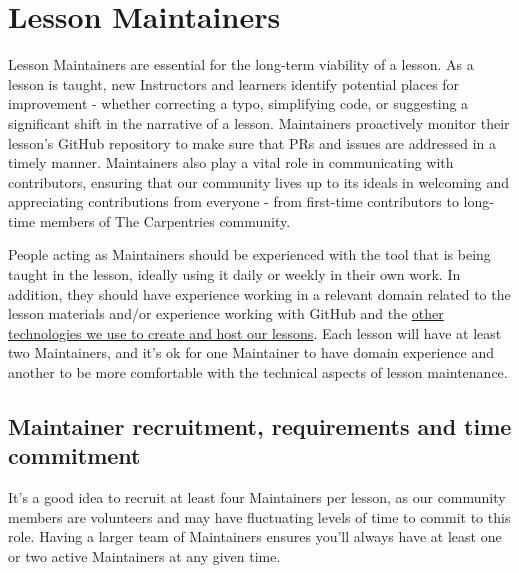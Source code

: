\documentclass[
]{book}
\begin{document}
\hypertarget{lesson-maintainers}{%
\section{Lesson Maintainers}\label{lesson-maintainers}}

Lesson Maintainers are essential for the long-term viability of a lesson. As a
lesson is taught, new Instructors and learners identify potential places
for improvement - whether correcting a typo, simplifying code, or suggesting
a significant shift in the narrative of a lesson. Maintainers proactively monitor
their lesson's GitHub repository to make sure that PRs and issues are addressed
in a timely manner. Maintainers also play a vital role in communicating with
contributors, ensuring that our community lives up to its ideals in welcoming
and appreciating contributions from everyone - from first-time contributors to long-time
members of The Carpentries community.

People acting as Maintainers should be experienced with the tool that is being
taught in the lesson, ideally using it daily or weekly in their own work. In
addition, they should have experience working in a relevant domain related to the
lesson materials and/or experience working with GitHub and the \protect\hyperlink{technological-introductions}{other technologies
we use to create and host our lessons}. Each
lesson will have at least two Maintainers, and it's ok for one Maintainer
to have domain experience and another to be more comfortable with the technical
aspects of lesson maintenance.

\hypertarget{maintainer-recruitment-requirements-and-time-commitment}{%
\subsection{Maintainer recruitment, requirements and time commitment}\label{maintainer-recruitment-requirements-and-time-commitment}}

It's a good idea to recruit at least four Maintainers per lesson, as our
community members are volunteers and may have fluctuating levels of time to
commit to this role. Having a larger team of Maintainers ensures you'll
always have
at least one or two active Maintainers at any given time.
\end{document}
